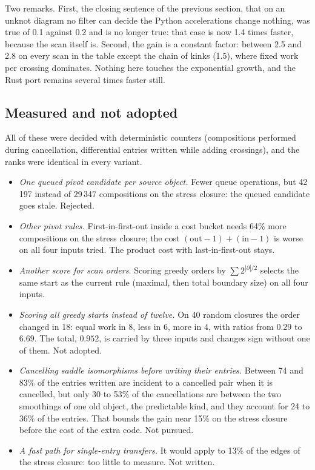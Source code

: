 Two remarks. First, the closing sentence of the previous section, that on an
unknot diagram no filter can decide the Python accelerations change nothing,
was true of 0.1 against 0.2 and is no longer true: that case is now 1.4 times
faster, because the scan itself is. Second, the gain is a constant factor:
between 2.5 and 2.8 on every scan in the table except the chain of kinks (1.5),
where fixed work per crossing dominates. Nothing here touches the exponential
growth, and the Rust port remains several times faster still.

\subsection{Measured and not adopted}
All of these were decided with deterministic counters (compositions performed
during cancellation, differential entries written while adding crossings), and
the ranks were identical in every variant.
\begin{itemize}
\item \emph{One queued pivot candidate per source object.} Fewer queue
  operations, but 42\,197 instead of 29\,347 compositions on the stress closure:
  the queued candidate goes stale. Rejected.
\item \emph{Other pivot rules.} First-in-first-out inside a cost bucket needs
  64\% more compositions on the stress closure; the cost
  $(\mathrm{out}-1)+(\mathrm{in}-1)$ is worse on all four inputs tried. The
  product cost with last-in-first-out stays.
\item \emph{Another score for scan orders.} Scoring greedy orders by
  $\sum 2^{|\partial|/2}$ selects the same start as the current rule (maximal,
  then total boundary size) on all four inputs.
\item \emph{Scoring all greedy starts instead of twelve.} On 40 random closures
  the order changed in 18: equal work in 8, less in 6, more in 4, with ratios
  from $0.29$ to $6.69$. The total, $0.952$, is carried by three inputs and
  changes sign without one of them. Not adopted.
\item \emph{Cancelling saddle isomorphisms before writing their entries.}
  Between 74 and 83\% of the entries written are incident to a cancelled pair
  when it is cancelled, but only 30 to 53\% of the cancellations are between
  the two smoothings of one old object, the predictable kind, and they account
  for 24 to 36\% of the entries. That bounds the gain near 15\% on the stress
  closure before the cost of the extra code. Not pursued.
\item \emph{A fast path for single-entry transfers.} It would apply to 13\% of
  the edges of the stress closure: too little to measure. Not written.
\end{itemize}
